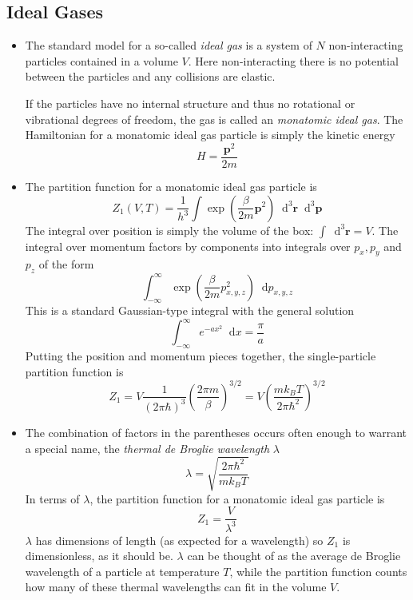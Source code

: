 \documentclass[11pt, a4paper]{article}
\newcommand{\diff}{\mathop{}\!\mathrm{d}} %
\begin{document}
\subsection{Ideal Gases}
\begin{itemize}
	\item The standard model for a so-called \textit{ideal gas} is a system of $ N $ non-interacting particles contained in a volume $ V $. Here non-interacting there is no potential between the particles and any collisions are elastic. 
	
	If the particles have no internal structure and thus no rotational or vibrational degrees of freedom, the gas is called an \textit{monatomic ideal gas}. The Hamiltonian for a monatomic ideal gas particle is simply the kinetic energy
	\begin{equation*}
		H = \frac{\bm{p}^{2}}{2m}
	\end{equation*}
	
	\item The partition function for a monatomic ideal gas particle is
	\begin{equation*}
		Z_{1}(V, T) = \frac{1}{h^{3}} \int \exp(\frac{\beta }{2m}\bm{p}^{2}) \diff^{3}\bm{r}\diff^{3}\bm{p}
	\end{equation*}
	The integral over position is simply the volume of the box: $ \int \diff^{3}\bm{r} = V $. The integral over momentum factors by components into integrals over $ p_{x}, p_{y} $ and $ p_{z} $ of the form
	\begin{equation*}
		\int_{-\infty}^{\infty} \exp(\frac{\beta }{2m}p_{x,y,z}^{2})\diff p_{x,y,z}
	\end{equation*}
	This is a standard Gaussian-type integral with the general solution
	\begin{equation*}
		\int_{-\infty}^{\infty} e^{-ax^{2}} \diff x = \frac{\pi}{a}
	\end{equation*}
	Putting the position and momentum pieces together, the single-particle partition function is
	\begin{equation*}
		Z_{1} = V \frac{1}{(2\pi \hbar)^{3}} \left(\frac{2\pi m}{\beta}\right)^{3/2} = V \left(\frac{mk_{B}T}{2\pi \hbar^{2}}\right)^{3/2}
	\end{equation*}
	
	\item The combination of factors in the parentheses occurs often enough to warrant a special name, the \textit{thermal de Broglie wavelength} $ \lambda $
	\begin{equation*}
		\lambda = \sqrt{\frac{2\pi \hbar^{2}}{mk_{B}T}}
	\end{equation*}
	In terms of $ \lambda $, the partition function for a monatomic ideal gas particle is
	\begin{equation*}
		Z_{1} = \frac{V}{\lambda^{3}}
	\end{equation*}
	$ \lambda $ has dimensions of length (as expected for a wavelength) so $ Z_{1} $ is dimensionless, as it should be. $ \lambda $ can be thought of as the average de Broglie wavelength of a particle at temperature $ T $, while the partition function counts how many of these thermal wavelengths can fit in the volume $ V $.
	

\end{itemize}
\end{document}
